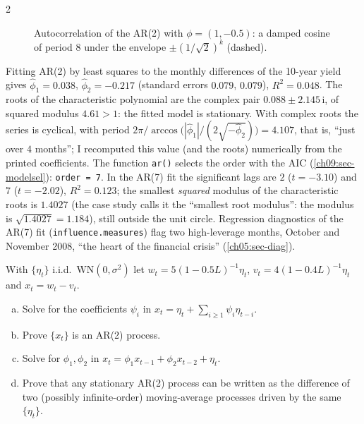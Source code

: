 \begin{paracol}{2}
\begin{figure}[ht]
\caption{Autocorrelation of the AR(2) with $\phi=(1,-0.5)$: a damped cosine of period $8$ under the
envelope $\pm(1/\sqrt2)^k$ (dashed).}\label{fig:ar2}
\end{figure}

\begin{casestudy}\label{ch09:cs-3b}
Fitting AR(2) by least squares to the monthly differences of the 10-year yield gives
$\hat\phi_1=0.038$, $\hat\phi_2=-0.217$ (standard errors $0.079$, $0.079$), $R^2=0.048$. The roots of the characteristic
polynomial are the complex pair $0.088\pm2.145\,\mathrm i$, of squared modulus $4.61>1$: the fitted model is
stationary. With complex roots the series is cyclical, with period
$2\pi/\arccos\bigl(|\hat\phi_1|/(2\sqrt{-\hat\phi_2})\bigr)=4.107$, that is, ``just over $4$ months''; I recomputed this value
(and the roots) numerically from the printed coefficients. The function \texttt{ar()} selects the order with the AIC
(\cref{ch09:sec-modelsel}): \texttt{order = 7}. In the AR(7) fit the significant lags are $2$ ($t=-3.10$) and $7$
($t=-2.02$), $R^2=0.123$; the smallest \emph{squared} modulus of the characteristic roots is $1.4027$ (the case study calls it
the ``smallest root modulus'': the modulus is $\sqrt{1.4027}=1.184$), still outside the unit circle. Regression diagnostics
of the AR(7) fit (\texttt{influence.measures}) flag two high-leverage months, October and November 2008, ``the heart of the
financial crisis'' (\cref{ch05:sec-diag}).
\end{casestudy}

\begin{exercise}\label{ch09:ex-ps6-2}
With $\{\eta_t\}$ i.i.d.\ $\mathrm{WN}(0,\sigma^2)$ let $w_t=5(1-0.5L)^{-1}\eta_t$, $v_t=4(1-0.4L)^{-1}\eta_t$ and $x_t=w_t-v_t$.
\begin{enumerate}[(a)]
  \item Solve for the coefficients $\psi_i$ in $x_t=\eta_t+\sum_{i\ge1}\psi_i\eta_{t-i}$.
  \item Prove $\{x_t\}$ is an AR(2) process.
  \item Solve for $\phi_1,\phi_2$ in $x_t=\phi_1x_{t-1}+\phi_2x_{t-2}+\eta_t$.
  \item Prove that any stationary AR(2) process can be written as the difference of two (possibly infinite-order) moving-average processes driven by the same $\{\eta_t\}$.
\end{enumerate}
\end{exercise}


\end{paracol}
